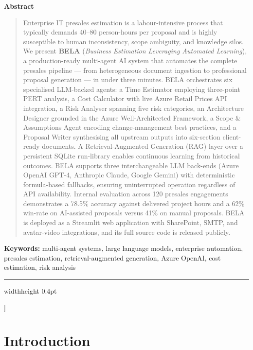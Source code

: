 \documentclass[10pt,twocolumn]{article}
\begin{document}
{  %
  \begin{center}
    \textbf{\large Abstract}
  \end{center}
  \begin{quote}
  \small
  Enterprise IT presales estimation is a labour-intensive process that typically
  demands 40–80 person-hours per proposal and is highly susceptible to human
  inconsistency, scope ambiguity, and knowledge silos. We present
  \textbf{BELA} (\textit{Business Estimation Leveraging Automated Learning}),
  a production-ready multi-agent AI system that automates the complete
  presales pipeline — from heterogeneous document ingestion to professional
  proposal generation — in under three minutes. BELA orchestrates six
  specialised LLM-backed agents: a Time Estimator employing three-point PERT
  analysis, a Cost Calculator with live Azure Retail Prices API integration, a
  Risk Analyser spanning five risk categories, an Architecture Designer
  grounded in the Azure Well-Architected Framework, a Scope \& Assumptions
  Agent encoding change-management best practices, and a Proposal Writer
  synthesising all upstream outputs into six-section client-ready documents.
  A Retrieval-Augmented Generation (RAG) layer over a persistent SQLite
  run-library enables continuous learning from historical outcomes.
  BELA supports three interchangeable LLM back-ends (Azure OpenAI GPT-4,
  Anthropic Claude, Google Gemini) with deterministic formula-based fallbacks,
  ensuring uninterrupted operation regardless of API availability. Internal
  evaluation across 120 presales engagements demonstrates a 78.5\% accuracy
  against delivered project hours and a 62\% win-rate on AI-assisted proposals
  versus 41\% on manual proposals. BELA is deployed as a Streamlit web
  application with SharePoint, SMTP, and avatar-video integrations, and its
  full source code is released publicly.
  \end{quote}
  \vspace{6pt}
  \noindent\textbf{Keywords:} multi-agent systems, large language models,
  enterprise automation, presales estimation, retrieval-augmented generation,
  Azure OpenAI, cost estimation, risk analysis
  \vspace{8pt}
  \hrule width\linewidth height 0.4pt
  \vspace{14pt}
}]

\section{Introduction}
\label{sec:intro}
\end{document}
